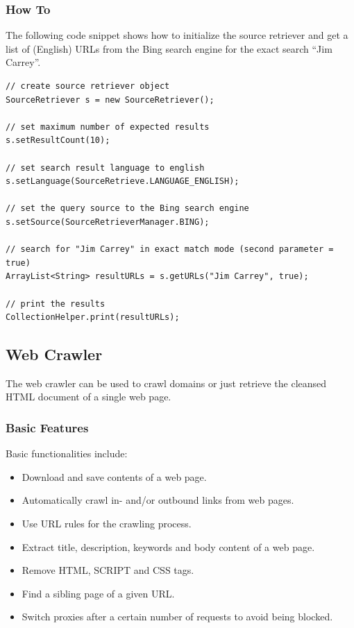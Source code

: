 \documentclass[a4paper,twoside]{book}      %
\begin{document}
\subsubsection{How To}
\label{sec:howto}
The following code snippet shows how to initialize the source retriever and get a list of (English) URLs from the Bing search engine for the exact search ``Jim Carrey''.
\begin{codelisting}
\begin{lstlisting}[frame=tb]
// create source retriever object
SourceRetriever s = new SourceRetriever();
		
// set maximum number of expected results 
s.setResultCount(10);
		
// set search result language to english
s.setLanguage(SourceRetrieve.LANGUAGE_ENGLISH);
		
// set the query source to the Bing search engine 
s.setSource(SourceRetrieverManager.BING);
		
// search for "Jim Carrey" in exact match mode (second parameter = true)
ArrayList<String> resultURLs = s.getURLs("Jim Carrey", true);
		
// print the results
CollectionHelper.print(resultURLs);	
\end{lstlisting}
\end{codelisting}


\subsection{Web Crawler}
The web crawler can be used to crawl domains or just retrieve the cleansed HTML document of a single web page.

\subsubsection{Basic Features}
Basic functionalities include:
\begin{itemize}
\item Download and save contents of a web page.
\item Automatically crawl in- and/or outbound links from web pages.
\item Use URL rules for the crawling process.
\item Extract title, description, keywords and body content of a web page.
\item Remove HTML, SCRIPT and CSS tags.
\item Find a sibling page of a given URL.
\item Switch proxies after a certain number of requests to avoid being blocked.
\end{itemize}
\end{document}
